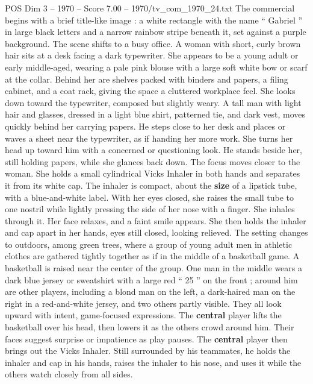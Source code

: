 \begin{textsample}{POS Dim 3 – 1970 – Score 7.00 – 1970/tv\_com\_1970\_24.txt}  \label{ex:f3_pos_036}
The commercial begins with a brief title-like image : a white rectangle with the name “ Gabriel ” in large black letters and a narrow rainbow stripe beneath it, set against a purple background.
The scene shifts to a busy office.
A woman with short, curly brown hair sits at a desk facing a dark typewriter.
She appears to be a young adult or early middle-aged, wearing a pale pink blouse with a large soft white bow or scarf at the collar.
Behind her are shelves packed with binders and papers, a filing cabinet, and a coat rack, giving the space a cluttered workplace feel.
She looks down toward the typewriter, composed but slightly weary.
A tall man with light hair and glasses, dressed in a light blue shirt, patterned tie, and dark vest, moves quickly behind her carrying papers.
He steps close to her desk and places or waves a sheet near the typewriter, as if handing her more work.
She turns her head up toward him with a concerned or questioning look.
He stands beside her, still holding papers, while she glances back down.
The focus moves closer to the woman.
She holds a small cylindrical Vicks Inhaler in both hands and separates it from its white cap.
The inhaler is compact, about the \textbf{size} of a lipstick tube, with a blue-and-white label.
With her eyes closed, she raises the small tube to one nostril while lightly pressing the side of her nose with a finger.
She inhales through it.
Her face relaxes, and a faint smile appears.
She then holds the inhaler and cap apart in her hands, eyes still closed, looking relieved.
The setting changes to outdoors, among green trees, where a group of young adult men in athletic clothes are gathered tightly together as if in the middle of a basketball game.
A basketball is raised near the center of the group.
One man in the middle wears a dark blue jersey or sweatshirt with a large red “ 25 ” on the front ; around him are other players, including a blond man on the left, a dark-haired man on the right in a red-and-white jersey, and two others partly visible.
They all look upward with intent, game-focused expressions.
The \textbf{central} player lifts the basketball over his head, then lowers it as the others crowd around him.
Their faces suggest surprise or impatience as play pauses.
The \textbf{central} player then brings out the Vicks Inhaler.
Still surrounded by his teammates, he holds the inhaler and cap in his hands, raises the inhaler to his nose, and uses it while the others watch closely from all sides.

\end{textsample}
